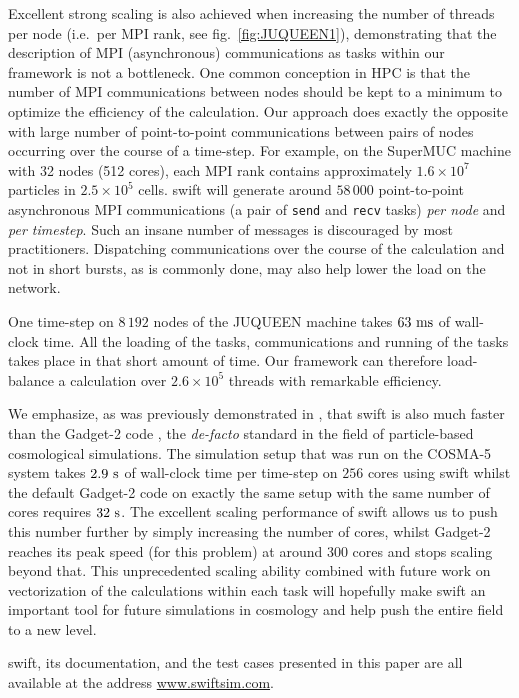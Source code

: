 \documentclass{sig-alternate-05-2015}
\newcommand{\gadget}{{\sc Gadget-2}\xspace}
\newcommand{\swift}{{\sc swift}\xspace}
\newcommand{\web}{\url{www.swiftsim.com}}
\begin{document}
Excellent strong scaling is also achieved when increasing the number of threads
per node (i.e.~per MPI rank, see fig.~\ref{fig:JUQUEEN1}), demonstrating that
the description of MPI (asynchronous) communications as tasks within our
framework is not a bottleneck. One common conception in HPC is that the number
of MPI communications between nodes should be kept to a minimum to optimize the
efficiency of the calculation. Our approach does exactly the opposite with large
number of point-to-point communications between pairs of nodes occurring over the
course of a time-step. For example, on the SuperMUC machine with 32 nodes (512
cores), each MPI rank contains approximately $1.6\times10^7$ particles in
$2.5\times10^5$ cells. \swift will generate around $58\,000$ point-to-point
asynchronous MPI communications (a pair of \texttt{send} and \texttt{recv} tasks)
{\em per node} and {\em per timestep}. Such an insane number of messages is
discouraged by most practitioners.
Dispatching communications
over the course of the calculation and not in short bursts, as is commonly done,
may also help lower the load on the network.

One time-step on $8\,192$ nodes of the JUQUEEN machine takes $63~\rm{ms}$ of
wall-clock time. All the loading of the tasks, communications and running of the
tasks takes place in that short amount of time. Our framework can therefore
load-balance a calculation over $2.6\times10^5$ threads with remarkable
efficiency.

We emphasize, as was previously demonstrated in \cite{ref:Gonnet2015}, that \swift
is also much faster than the \gadget code \cite{Springel2005}, the
\emph{de-facto} standard in the field of particle-based cosmological
simulations. The simulation setup that was run on the COSMA-5
system takes $2.9~\rm{s}$ of wall-clock time per time-step on $256$ cores using
\swift whilst the default \gadget code on exactly the same setup with the same
number of cores requires $32~\rm{s}$.
The excellent scaling
performance of \swift allows us to push this number further by simply increasing
the number of cores, whilst \gadget reaches its peak speed (for this problem) at
around 300 cores and stops scaling beyond that. This unprecedented scaling
ability combined with future work on vectorization of the calculations within
each task will hopefully make \swift an important tool for future simulations in
cosmology and help push the entire field to a new level.

\swift, its documentation, and the test cases presented in this paper are all
available at the address \web.
\end{document}
